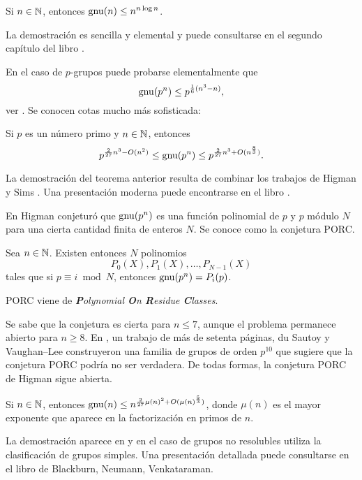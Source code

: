 \begin{theorem}
Si $n\in\mathbb{N}$, entonces $\operatorname{gnu}(n)\leq n^{n\log n}$.
\end{theorem}

La demostración es sencilla y elemental y puede consultarse en el segundo 
capítulo del libro \cite{MR2382539}. 

En el caso de $p$-grupos puede probarse elementalmente que 
\[
\operatorname{gnu}(p^n)\leq p^{\frac16(n^3-n)},
\]
ver \cite[Theorem 5.1]{MR2382539}. Se conocen 
cotas mucho más sofisticada: 

\begin{theorem}
Si $p$ es un número primo y $n\in\mathbb{N}$, entonces 
\[
p^{\frac{2}{27}n^3-O(n^2)}\leq\operatorname{gnu}(p^n)\leq p^{\frac{2}{27}n^3+O(n^{\frac{8}{3}})}.
\]
\end{theorem}

La demostración del teorema anterior resulta de combinar los trabajos de Higman \cite{MR113948} 
y Sims \cite{MR169921}. Una presentación moderna puede encontrarse en el libro
\cite{MR2382539}. 

En \cite{MR123605} Higman conjeturó 
que $\operatorname{gnu}(p^n)$ es una función polinomial de $p$ y $p$ módulo $N$ para una cierta
cantidad finita de enteros $N$. Se conoce como la conjetura PORC.

\begin{conjecture}[Higman]
Sea $n\in\mathbb{N}$. Existen entonces $N$ polinomios 
\[
P_{0}(X),P_{1}(X),\dots,P_{N-1}(X)
\]
tales que
si $p\equiv i\bmod N$, entonces $\operatorname{gnu}(p^n)=P_{i}(p)$. 
\end{conjecture}

PORC viene de \emph{\textbf{P}olynomial \textbf{O}n \textbf{R}esidue \textbf{C}lasses}. 

Se sabe que la conjetura es cierta para $n\leq7$, aunque el problema permanece abierto para $n\geq8$. 
En \cite{MR2921623}, un trabajo de más de setenta páginas, 
du Sautoy y Vaughan--Lee construyeron una familia de grupos
de orden $p^{10}$ que sugiere que la conjetura PORC podría no ser verdadera. De todas formas, la conjetura
PORC de Higman sigue abierta. 

\begin{theorem}[Pyber]
Si $n\in\mathbb{N}$, entonces 
$\operatorname{gnu}(n)\leq n^{\frac{2}{27}\mu(n)^2+O(\mu(n)^{\frac{5}{3}})}$, donde $\mu(n)$ es el mayor exponente
que aparece en la factorización en primos de $n$. 
\end{theorem}

La demostración aparece en \cite{MR1200081} y en el caso de grupos no resolubles utiliza la clasificación de grupos simples. Una presentación detallada puede consultarse en el libro 
\cite{MR2382539} de Blackburn, Neumann, Venkataraman.

